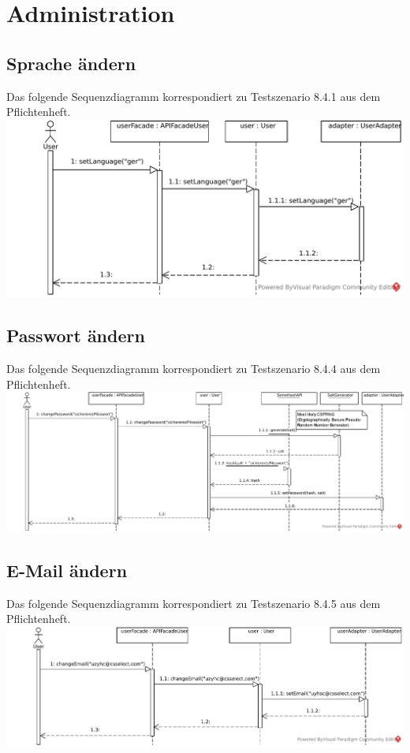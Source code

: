 \documentclass[a4paper]{scrreprt}
\begin{document}
	\section{Administration}
	\subsection{Sprache ändern}
	Das folgende Sequenzdiagramm korrespondiert zu Testszenario 8.4.1 aus dem Pflichtenheft. \\
	\includegraphics[width=\textwidth]{img/SpracheAendern.pdf}

	\subsection{Passwort ändern}
	Das folgende Sequenzdiagramm korrespondiert zu Testszenario 8.4.4 aus dem Pflichtenheft. \\
	\includegraphics[width=\textwidth]{img/PasswordAendern.pdf}

	\subsection{E-Mail ändern}
	Das folgende Sequenzdiagramm korrespondiert zu Testszenario 8.4.5 aus dem Pflichtenheft. \\
	\includegraphics[width=\textwidth]{img/EmailAendern.pdf}
\end{document}
